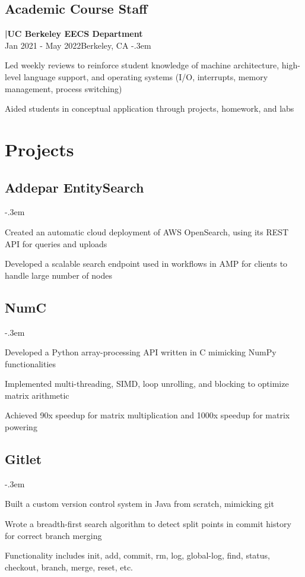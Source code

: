 \documentclass{article}
\let\olditemize=\itemize \let\endolditemize=\enditemize
\renewenvironment{itemize}{\olditemize[topsep=0em] \itemsep-.3em}{\endolditemize}
\newcommand{\entry}[3]{\quad\textbf{|\quad#1}\\#2\qquad#3}
\begin{document}
\subsection{Academic Course Staff}
\entry{UC Berkeley EECS Department}{Jan 2021 - May 2022}{Berkeley, CA}
\begin{itemize}
  \item Led weekly reviews to reinforce student knowledge of machine architecture, high-level language support, and operating systems (I/O, interrupts, memory management, process switching)
  \item Aided students in conceptual application through projects, homework, and labs
\end{itemize}


\section{Projects}

\subsection{Addepar EntitySearch}
\begin{itemize}
  \item Created an automatic cloud deployment of AWS OpenSearch, using its REST API for queries and uploads
  \item Developed a scalable search endpoint used in workflows in AMP for clients to handle large number of nodes
\end{itemize}

\subsection{NumC}
\begin{itemize}
  \item Developed a Python array-processing API written in C mimicking NumPy functionalities
  \item Implemented multi-threading, SIMD, loop unrolling, and blocking to optimize matrix arithmetic
  \item Achieved 90x speedup for matrix multiplication and 1000x speedup for matrix powering
\end{itemize}

\subsection{Gitlet}
\begin{itemize}
  \item Built a custom version control system in Java from scratch, mimicking git
  \item Wrote a breadth-first search algorithm to detect split points in commit history for correct branch merging
  \item Functionality includes init, add, commit, rm, log, global-log, find, status, checkout, branch, merge, reset, etc.
\end{itemize}
\end{document}
